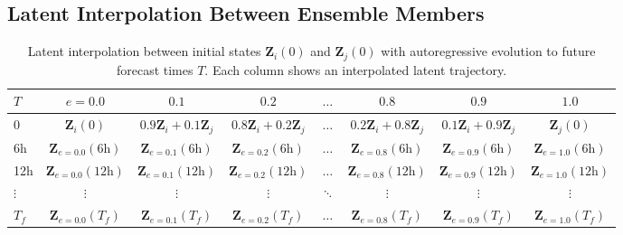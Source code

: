 \documentclass{agujournal2019}
\begin{document}
\subsection{Latent Interpolation Between Ensemble Members}

\begin{table}[h!]
\centering
\small
\begin{tabular}{lccccccc}
\toprule
\textbf{$T$} & $e{=}0.0$ & $0.1$ & $0.2$ & $\dots$ & $0.8$ & $0.9$ & $1.0$ \\
\midrule
0 & $\mathbf{Z}_i(0)$ & $0.9\mathbf{Z}_i{+}0.1\mathbf{Z}_j$ & $0.8\mathbf{Z}_i{+}0.2\mathbf{Z}_j$ & $\dots$ & $0.2\mathbf{Z}_i{+}0.8\mathbf{Z}_j$ & $0.1\mathbf{Z}_i{+}0.9\mathbf{Z}_j$ & $\mathbf{Z}_j(0)$ \\
6h & $\mathbf{Z}_{e=0.0}(6\text{h})$ & $\mathbf{Z}_{e=0.1}(6\text{h})$ & $\mathbf{Z}_{e=0.2}(6\text{h})$ & $\dots$ & $\mathbf{Z}_{e=0.8}(6\text{h})$ & $\mathbf{Z}_{e=0.9}(6\text{h})$ & $\mathbf{Z}_{e=1.0}(6\text{h})$ \\
12h & $\mathbf{Z}_{e=0.0}(12\text{h})$ & $\mathbf{Z}_{e=0.1}(12\text{h})$ & $\mathbf{Z}_{e=0.2}(12\text{h})$ & $\dots$ & $\mathbf{Z}_{e=0.8}(12\text{h})$ & $\mathbf{Z}_{e=0.9}(12\text{h})$ & $\mathbf{Z}_{e=1.0}(12\text{h})$ \\
$\vdots$ & $\vdots$ & $\vdots$ & $\vdots$ & $\ddots$ & $\vdots$ & $\vdots$ & $\vdots$ \\
$T_f$ & $\mathbf{Z}_{e=0.0}(T_f)$ & $\mathbf{Z}_{e=0.1}(T_f)$ & $\mathbf{Z}_{e=0.2}(T_f)$ & $\dots$ & $\mathbf{Z}_{e=0.8}(T_f)$ & $\mathbf{Z}_{e=0.9}(T_f)$ & $\mathbf{Z}_{e=1.0}(T_f)$ \\
\bottomrule
\end{tabular}
\caption{Latent interpolation between initial states $\mathbf{Z}_i(0)$ and $\mathbf{Z}_j(0)$ with autoregressive evolution to future forecast times $T$. Each column shows an interpolated latent trajectory.}
\label{tab:latent_interp}
\end{table}
\end{document}
